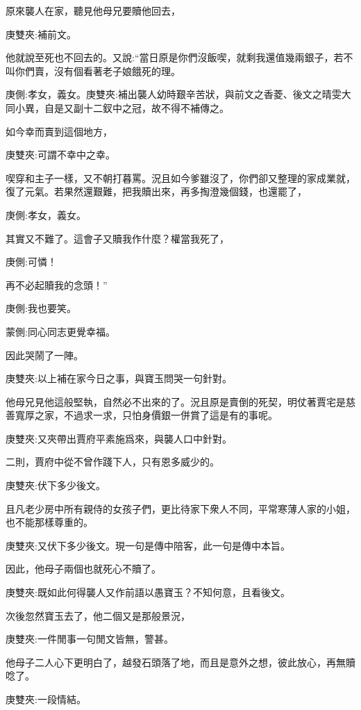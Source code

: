 \begin{parag}
    原來襲人在家，聽見他母兄要贖他回去，\begin{note}庚雙夾:補前文。\end{note}他就說至死也不回去的。又說:“當日原是你們沒飯喫，就剩我還值幾兩銀子，若不叫你們賣，沒有個看著老子娘餓死的理。\begin{note}庚側:孝女，義女。庚雙夾:補出襲人幼時艱辛苦狀，與前文之香菱、後文之晴雯大同小異，自是又副十二釵中之冠，故不得不補傳之。\end{note}如今幸而賣到這個地方，\begin{note}庚雙夾:可謂不幸中之幸。\end{note}喫穿和主子一樣，又不朝打暮罵。況且如今爹雖沒了，你們卻又整理的家成業就，復了元氣。若果然還艱難，把我贖出來，再多掏澄幾個錢，也還罷了，\begin{note}庚側:孝女，義女。\end{note}其實又不難了。這會子又贖我作什麼？權當我死了，\begin{note}庚側:可憐！\end{note}再不必起贖我的念頭！”\begin{note}庚側:我也要笑。\end{note}\begin{note}蒙側:同心同志更覺幸福。\end{note}因此哭鬧了一陣。\begin{note}庚雙夾:以上補在家今日之事，與寶玉問哭一句針對。\end{note}
\end{parag}


\begin{parag}
    他母兄見他這般堅執，自然必不出來的了。況且原是賣倒的死契，明仗著賈宅是慈善寬厚之家，不過求一求，只怕身價銀一併賞了這是有的事呢。\begin{note}庚雙夾:又夾帶出賈府平素施爲來，與襲人口中針對。\end{note}二則，賈府中從不曾作踐下人，只有恩多威少的。\begin{note}庚雙夾:伏下多少後文。\end{note}且凡老少房中所有親侍的女孩子們，更比待家下衆人不同，平常寒薄人家的小姐，也不能那樣尊重的。\begin{note}庚雙夾:又伏下多少後文。現一句是傳中陪客，此一句是傳中本旨。\end{note}因此，他母子兩個也就死心不贖了。\begin{note}庚雙夾:既如此何得襲人又作前語以愚寶玉？不知何意，且看後文。\end{note}次後忽然寶玉去了，他二個又是那般景況，\begin{note}庚雙夾:一件閒事一句閒文皆無，警甚。\end{note}他母子二人心下更明白了，越發石頭落了地，而且是意外之想，彼此放心，再無贖唸了。\begin{note}庚雙夾:一段情結。\end{note}
\end{parag}


